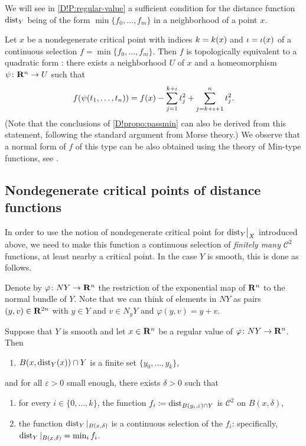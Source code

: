 We will see in \cref{D!P:regular-value} a sufficient condition for the distance function $\operatorname{dist}_Y$ being of the form $\min\{f_0, \ldots, f_m\}$ in a neighborhood of a point $x$.

\begin{remark}
\label{D!rmk:normalformdist}
  Let $x$ be a nondegenerate critical point with indices $k = k(x)$ and $\iota = \iota(x)$ of a continuous selection $f=\min\{f_0, \ldots, f_m\}$. Then $f$ is topologically equivalent to a quadratic form \cite[Corollary~3.4]{JongenPallaschke1988}:
  there exists a neighborhood $U$ of $x$ and a homeomorphism $\psi\colon\mathbf{R}^n \to U$ such that
  \begin{equation*}
    f(\psi(t_1, \ldots, t_{n})) = f(x) - \sum_{j=1}^{k + \iota}t_{j}^2+\sum_{j=k + \iota + 1}^n t_j^2 .
  \end{equation*}
  (Note that the conclusions of \cref{D!propo:passmin} can also be derived from this statement, following the standard argument from Morse theory.) 
  We observe that a normal form of $f$ of this type can be also obtained using the theory of Min-type functions, see \cite[Sect.~3.2]{gershkovich1997morse}.
\end{remark}

\subsection{Nondegenerate critical points of distance functions}

In order to use the notion of nondegenerate critical point for $\mathord{\operatorname{dist}}_Y\big|_X$ introduced above, we need to make this function a continuous selection of \textit{finitely many} $\mathcal{C}^2$ functions, at least nearby a
critical point. In the case $Y$ is smooth, this is done as follows.

Denote by $\varphi \colon NY\to \mathbf{R}^n$ the restriction of the exponential map of $\mathbf{R}^n$ to the normal bundle of $Y$. Note that we can think of elements in $NY$ as pairs $(y, v)\in \mathbf{R}^{2n}$ with $y\in Y$ and $v\in N_yY$ and $\varphi(y,v)=y+v.$

\begin{proposition}
\label{D!P:regular-value}
  Suppose that $Y$ is smooth and let $x \in \mathbf{R}^n$ be a regular value of $\varphi \colon NY \to \mathbf{R}^n$. Then
  \begin{enumerate}
    \item \label{D!I:finite} $B(x, \operatorname{dist}_Y(x)) \cap Y$ is a finite set $\{y_0, \ldots, y_k\}$,
  \end{enumerate}
  and for all $\varepsilon > 0$ small enough, there exists $\delta >0$ such that
  \begin{enumerate}[resume]
    \item \label{D!I:C2} for every $i \in \{0, \ldots, k\}$, the function $f_i \coloneq \operatorname{dist}_{B(y_i, \varepsilon) \cap Y}$ is $\mathcal{C}^2$ on $B(x, \delta)$,
    \item \label{D!I:CS} the function $\operatorname{dist}_Y|_{B(x, \delta)}$ is a continuous selection of the $f_i$: specifically, $\operatorname{dist}_Y|_{B(x, \delta)} = \min_i f_i$.
  \end{enumerate}
\end{proposition}

